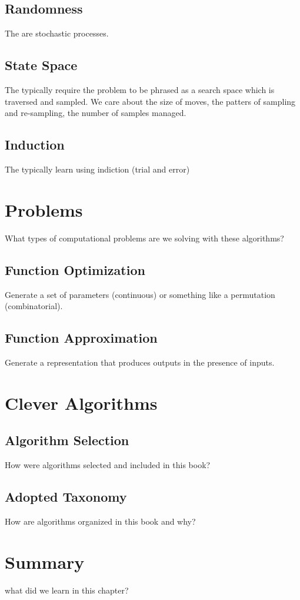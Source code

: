 \subsection{Randomness}
The are stochastic processes.

\subsection{State Space}
The typically require the problem to be phrased as a search space which is traversed and sampled.
We care about the size of moves, the patters of sampling and re-sampling, the number of samples managed.

\subsection{Induction}
The typically learn using indiction (trial and error)



\section{Problems}
What types of computational problems are we solving with these algorithms?

\subsection{Function Optimization}
Generate a set of parameters (continuous) or something like a permutation (combinatorial).

\subsection{Function Approximation}
Generate a representation that produces outputs in the presence of inputs.


\section{Clever Algorithms}

\subsection{Algorithm Selection}
How were algorithms selected and included in this book?

\subsection{Adopted Taxonomy}
How are algorithms organized in this book and why?

\subsection{}


\section{Summary}
what did we learn in this chapter?